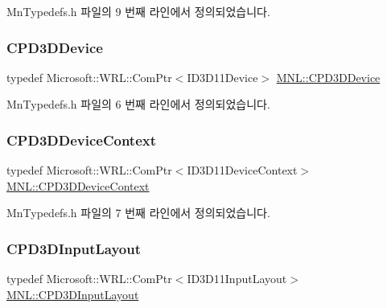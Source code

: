 Mn\+Typedefs.\+h 파일의 9 번째 라인에서 정의되었습니다.

\mbox{\label{namespace_m_n_l_a1eec210db8f309a4a9ac0d9658784c31}} 
\subsubsection{\texorpdfstring{C\+P\+D3\+D\+Device}{CPD3DDevice}}
{\footnotesize\ttfamily typedef Microsoft\+::\+W\+R\+L\+::\+Com\+Ptr$<$I\+D3\+D11\+Device$>$ \hyperlink{namespace_m_n_l_a1eec210db8f309a4a9ac0d9658784c31}{M\+N\+L\+::\+C\+P\+D3\+D\+Device}}



Mn\+Typedefs.\+h 파일의 6 번째 라인에서 정의되었습니다.

\mbox{\label{namespace_m_n_l_aab3aabb6c9360e44ddc8b0bb563c2107}} 
\subsubsection{\texorpdfstring{C\+P\+D3\+D\+Device\+Context}{CPD3DDeviceContext}}
{\footnotesize\ttfamily typedef Microsoft\+::\+W\+R\+L\+::\+Com\+Ptr$<$I\+D3\+D11\+Device\+Context$>$ \hyperlink{namespace_m_n_l_aab3aabb6c9360e44ddc8b0bb563c2107}{M\+N\+L\+::\+C\+P\+D3\+D\+Device\+Context}}



Mn\+Typedefs.\+h 파일의 7 번째 라인에서 정의되었습니다.

\mbox{\label{namespace_m_n_l_aec7a2a132d6e72492d5feb5926d838dd}} 
\subsubsection{\texorpdfstring{C\+P\+D3\+D\+Input\+Layout}{CPD3DInputLayout}}
{\footnotesize\ttfamily typedef Microsoft\+::\+W\+R\+L\+::\+Com\+Ptr$<$I\+D3\+D11\+Input\+Layout$>$ \hyperlink{namespace_m_n_l_aec7a2a132d6e72492d5feb5926d838dd}{M\+N\+L\+::\+C\+P\+D3\+D\+Input\+Layout}}



